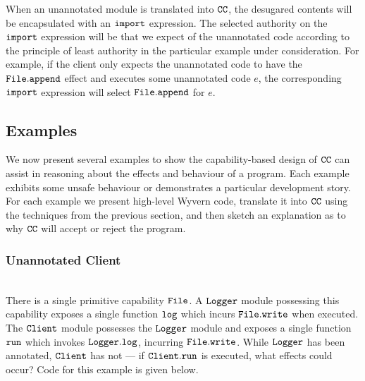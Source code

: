 When an unannotated module is translated into $\mathtt{CC}$, the desugared contents will be encapsulated with an $\mathtt{import}$ expression. The selected authority on the $\mathtt{import}$ expression will be that we expect of the unannotated code according to the principle of least authority in the particular example under consideration. For example, if the client only expects the unannotated code to have the $\mathtt{File.append}$ effect and executes some unannotated code $e$, the corresponding $\mathtt{import}$ expression will select $\mathtt{File.append}$ for $e$.


\subsection{Examples}

We now present several examples to show the capability-based design of $\mathtt{CC}$ can assist in reasoning about the effects and behaviour of a program. Each example exhibits some unsafe behaviour or demonstrates a particular development story. For each example we present high-level Wyvern code, translate it into $\mathtt{CC}$ using the techniques from the previous section, and then sketch an explanation as to why $\mathtt{CC}$ will accept or reject the program.\\









































\subsubsection{Unannotated Client}~\\

There is a single primitive capability $\mathtt{File}$. A $\mathtt{Logger}$ module possessing this capability exposes a single function $\mathtt{log}$ which incurs $\mathtt{File.write}$ when executed. The $\mathtt{Client}$ module possesses the $\mathtt{Logger}$ module and exposes a single function $\mathtt{run}$ which invokes $\mathtt{Logger.log}$, incurring $\mathtt{File.write}$. While $\mathtt{Logger}$ has been annotated, $\mathtt{Client}$ has not --- if $\mathtt{Client.run}$ is executed, what effects could occur? Code for this example is given below. 

